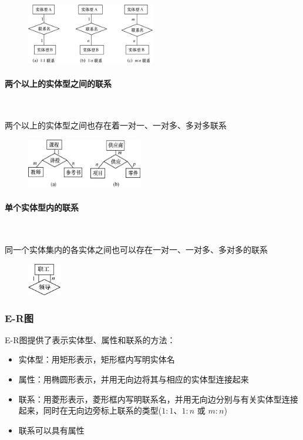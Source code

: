 \begin{figure}[H]
    \vspace{-0.5em}
	\centering
	\includegraphics[width=0.5\textwidth]{images/7.3.2.1.1}
    \vspace{-1em}
\end{figure}

\paragraph*{两个以上的实体型之间的联系}~{}

两个以上的实体型之间也存在着一对一、一对多、多对多联系
\begin{figure}[H]
    \vspace{-0.5em}
	\centering
	\includegraphics[width=0.45\textwidth]{images/7.3.2.1.2}
    \vspace{-1em}
\end{figure}

\paragraph*{单个实体型内的联系}~{}

同一个实体集内的各实体之间也可以存在一对一、一对多、多对多的联系
\begin{figure}[H]
    \vspace{-0.5em}
	\centering
	\includegraphics[width=0.13\textwidth]{images/7.3.2.1.3}
    \vspace{-1em}
\end{figure}

\subsubsection{E-R图}
E-R图提供了表示实体型、属性和联系的方法：
\begin{itemize}
    \item 实体型：用矩形表示，矩形框内写明实体名
    \item 属性：用椭圆形表示，并用无向边将其与相应的实体型连接起来
    \item 联系：用菱形表示，菱形框内写明联系名，并用无向边分别与有关实体型连接起来，同时在无向边旁标上联系的类型($1:1$、$1:n$ 或 $m:n$)
    \item 联系可以具有属性
\end{itemize}

